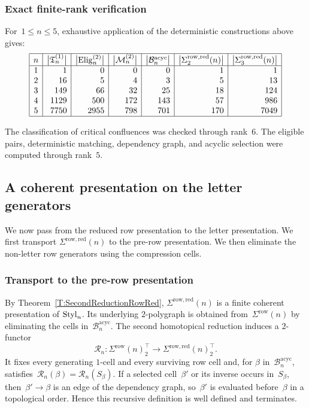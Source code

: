 \documentclass[a4paper, twoside, 11pt, english]{article}
\begin{document}
\subsubsection{Exact finite-rank verification}

For~$1\leq n\leq5$, exhaustive application of the deterministic
constructions above gives:
\[
\begin{array}{|c|r|r|r|r|r|r|}
\hline
n
&
\bigl|\mathfrak T_n^{(1)}\bigr|
&
\bigl|\operatorname{Elig}^{(2)}_n\bigr|
&
\bigl|\mathcal M_n^{(2)}\bigr|
&
\bigl|\mathcal B_n^{\mathrm{acyc}}\bigr|
&
\bigl|\Sigma^{\mathrm{row,red}}_2(n)\bigr|
&
\bigl|\Sigma^{\mathrm{row,red}}_3(n)\bigr|
\\ \hline
1&1&0&0&0&1&1\\
2&16&5&4&3&5&13\\
3&149&66&32&25&18&124\\
4&1129&500&172&143&57&986\\
5&7750&2955&798&701&170&7049\\\hline
\end{array}
\]

The classification of critical confluences was checked through rank~$6$.
The eligible pairs, deterministic matching, dependency graph, and
acyclic selection were computed through rank~$5$.



\subsection{A coherent presentation on the letter generators}
\label{SS:CoherentPresentationLetterGenerators}

We now pass from the reduced row presentation to the letter
presentation. We first transport
$\Sigma^{\mathrm{row,red}}(n)$ to the pre-row presentation. We then
eliminate the non-letter row generators using the compression cells.

\subsubsection{Transport to the pre-row presentation}

By Theorem~\ref{T:SecondReductionRowRed},
$\Sigma^{\mathrm{row,red}}(n)$ is a finite coherent presentation of
$\mathrm{Styl}_n$. Its underlying $2$-polygraph is obtained from~$\Sigma^{\mathrm{row}}(n)$ by eliminating the cells in~$\mathcal B_n^{\mathrm{acyc}}$.
The second homotopical reduction induces a $2$-functor
\[
\mathcal R_n\colon
\Sigma^{\mathrm{row}}(n)_2^\top
\longrightarrow
\Sigma^{\mathrm{row,red}}(n)_2^\top.
\]
It fixes every generating $1$-cell and every surviving row cell and, for
$\beta$ in~$\mathcal B_n^{\mathrm{acyc}}$, satisfies~$\mathcal R_n(\beta)=\mathcal R_n(S_\beta)$.
If a selected cell~$\beta'$ or its inverse occurs in~$S_\beta$, then~$\beta'\to\beta$ is an edge of the dependency graph, so~$\beta'$ is evaluated before~$\beta$ in a topological order. Hence this recursive
definition is well defined and terminates.
\end{document}
